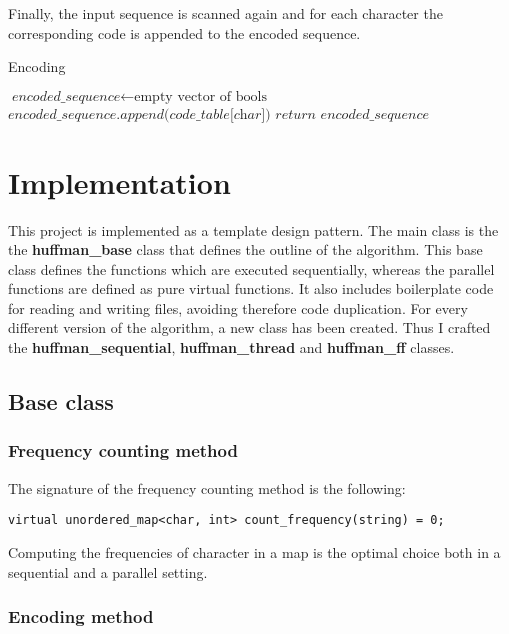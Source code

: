 \documentclass{report}
\begin{document}
Finally, the input sequence is scanned again and for each character the corresponding
code is appended to the encoded sequence.

\begin{algorithm}
\caption{Encoding}
\begin{algorithmic}[1]

\State $\textit{encoded\_sequence} \gets \text{empty vector of bools}$
\State $\textit{encoded\_sequence.append(code\_table[char])}$
\EndFor
\State $ \textit{return encoded\_sequence}$
\EndProcedure
\end{algorithmic}
\end{algorithm}

\chapter{Implementation}
This project is implemented as a template design pattern. The main class is the
the \textbf{huffman\_base} class that defines the outline of the algorithm.
This base class defines the functions which are executed sequentially, whereas
the parallel functions are defined as pure virtual functions.
It also includes boilerplate code for reading and writing files,
avoiding therefore code duplication.
For every different version of the algorithm, a new class has been created.
Thus I crafted the \textbf{huffman\_sequential}, \textbf{huffman\_thread} and
\textbf{huffman\_ff} classes.

\section*{Base class}
\subsection*{Frequency counting method}
The signature of the frequency counting method is the following:
\begin{verbatim}
virtual unordered_map<char, int> count_frequency(string) = 0;
\end{verbatim}
Computing the frequencies of character in a map is the optimal choice
both in a sequential and a parallel setting.

\subsection*{Encoding method}
\end{document}
